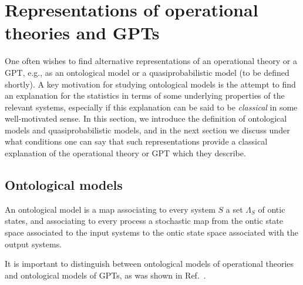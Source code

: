 \documentclass[10pt,twocolumn,aps,groupedaddress,nofootinbib]{revtex4}
\begin{document}
\section{Representations of operational theories and GPTs}

One often wishes to find alternative representations of an operational theory or a GPT, e.g., as an ontological model or a quasiprobabilistic model (to be defined shortly). A key motivation for studying ontological models is the attempt to find an explanation for the statistics in terms of some underlying properties of the relevant systems, especially if this explanation can be said to be {\em classical} in some well-motivated sense. In this section, we introduce the definition of ontological models and quasiprobabilistic models, and in the next section we discuss under what conditions one can say that such representations provide a classical explanation of the operational theory or GPT which they describe.


\subsection{Ontological models}\label{subsec:ont}

An ontological model is a map associating to every system $S$ a set $\Lambda_S$ of ontic states, and associating to every process a stochastic map from the ontic state space associated to the input systems to the ontic state space associated with the output systems.

It is important to distinguish between ontological models of operational theories and ontological models of GPTs, as was shown in Ref.~\cite{schmid2019characterization}.
\end{document}
